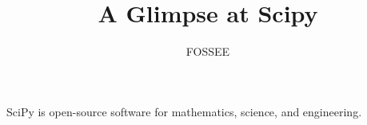 \documentclass{article}
\title{A Glimpse at Scipy}
\author{FOSSEE}
\begin{document}
\maketitle
SciPy is open-source software for mathematics, science, and
engineering.   
\end{document}
